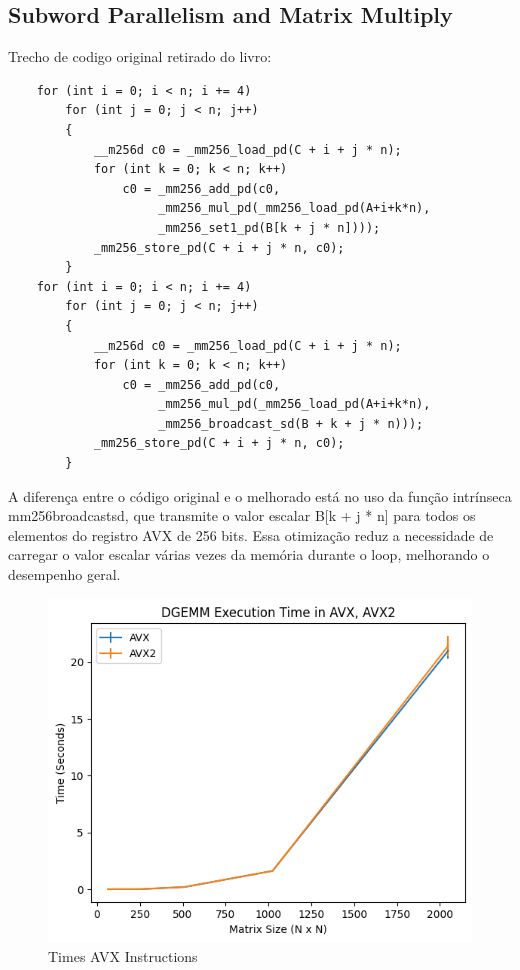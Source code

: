 \documentclass[12pt]{article}
\begin{document}
\subsection{Subword Parallelism and Matrix Multiply}

Trecho de codigo original retirado do livro:

\begin{lstlisting}
    for (int i = 0; i < n; i += 4)
        for (int j = 0; j < n; j++)
        {
            __m256d c0 = _mm256_load_pd(C + i + j * n);
            for (int k = 0; k < n; k++)
                c0 = _mm256_add_pd(c0,
                     _mm256_mul_pd(_mm256_load_pd(A+i+k*n),
                     _mm256_set1_pd(B[k + j * n])));
            _mm256_store_pd(C + i + j * n, c0);
        }
    for (int i = 0; i < n; i += 4)
        for (int j = 0; j < n; j++)
        {
            __m256d c0 = _mm256_load_pd(C + i + j * n);
            for (int k = 0; k < n; k++)
                c0 = _mm256_add_pd(c0,
                     _mm256_mul_pd(_mm256_load_pd(A+i+k*n),
                     _mm256_broadcast_sd(B + k + j * n)));
            _mm256_store_pd(C + i + j * n, c0);
        }
\end{lstlisting}

A diferença entre o código original e o melhorado está no uso da função intrínseca mm256broadcastsd, que transmite o valor escalar B[k + j * n] para todos os elementos do registro AVX de 256 bits. Essa otimização reduz a necessidade de carregar o valor escalar várias vezes da memória durante o loop, melhorando o desempenho geral.

\begin{figure}[h]
    \centering
    \includegraphics[scale=0.75]{figures/times_avx.png}
    \caption{Times AVX Instructions}
    \label{fig:times-avx}
\end{figure}
\end{document}
